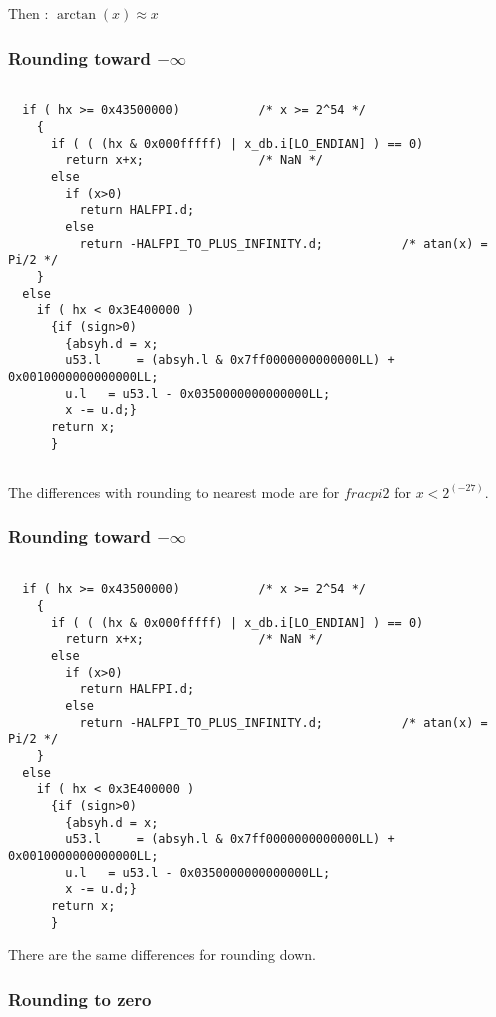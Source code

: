 Then : $\arctan(x) \approx x $
\bigskip

\subsubsection{Rounding toward $-\infty$}
\begin{lstlisting}[caption={Exceptional cases : rounding up},firstnumber=1]

  if ( hx >= 0x43500000)           /* x >= 2^54 */
    {
      if ( ( (hx & 0x000fffff) | x_db.i[LO_ENDIAN] ) == 0)
        return x+x;                /* NaN */
      else
        if (x>0)
          return HALFPI.d;
        else
          return -HALFPI_TO_PLUS_INFINITY.d;           /* atan(x) = Pi/2 */
    }
  else
    if ( hx < 0x3E400000 )
      {if (sign>0)
        {absyh.d = x;
        u53.l     = (absyh.l & 0x7ff0000000000000LL) +  0x0010000000000000LL;
        u.l   = u53.l - 0x0350000000000000LL;
        x -= u.d;}
      return x;
      }
  
\end{lstlisting}

The differences with rounding to nearest mode are for $frac{pi}{2}$ for
$x<2^(-27)$.

\subsubsection{Rounding toward $-\infty$}

\begin{lstlisting}[caption={Exceptional cases : rounding up},firstnumber=1]

  if ( hx >= 0x43500000)           /* x >= 2^54 */
    {
      if ( ( (hx & 0x000fffff) | x_db.i[LO_ENDIAN] ) == 0)
        return x+x;                /* NaN */
      else
        if (x>0)
          return HALFPI.d;
        else
          return -HALFPI_TO_PLUS_INFINITY.d;           /* atan(x) = Pi/2 */
    }
  else
    if ( hx < 0x3E400000 )
      {if (sign>0)
        {absyh.d = x;
        u53.l     = (absyh.l & 0x7ff0000000000000LL) +  0x0010000000000000LL;
        u.l   = u53.l - 0x0350000000000000LL;
        x -= u.d;}
      return x;
      }

\end{lstlisting}

There are the same differences for rounding down.

\subsubsection{Rounding to zero}

